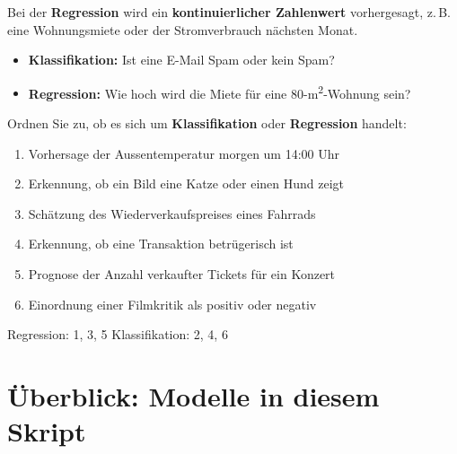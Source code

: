 \begin{mydefinition}[Regression]
Bei der \textbf{Regression} wird ein \textbf{kontinuierlicher Zahlenwert}
vorhergesagt, z.\,B. eine Wohnungsmiete oder der Stromverbrauch nächsten Monat.
\end{mydefinition}

\begin{myexample}
\begin{itemize}
    \item \textbf{Klassifikation:} Ist eine E-Mail Spam oder kein Spam?
    \item \textbf{Regression:} Wie hoch wird die Miete für eine 80-m\textsuperscript{2}-Wohnung sein?
\end{itemize}
\end{myexample}

\begin{myexercise}
Ordnen Sie zu, ob es sich um \textbf{Klassifikation} oder \textbf{Regression} handelt:
\begin{enumerate}
    \item Vorhersage der Aussentemperatur morgen um 14:00 Uhr
    \item Erkennung, ob ein Bild eine Katze oder einen Hund zeigt
    \item Schätzung des Wiederverkaufspreises eines Fahrrads
    \item Erkennung, ob eine Transaktion betrügerisch ist
    \item Prognose der Anzahl verkaufter Tickets für ein Konzert
    \item Einordnung einer Filmkritik als positiv oder negativ
\end{enumerate}
\begin{myanswer}
Regression: 1, 3, 5 \hspace{1cm} Klassifikation: 2, 4, 6
\end{myanswer}
\end{myexercise}

\section{Überblick: Modelle in diesem Skript}


